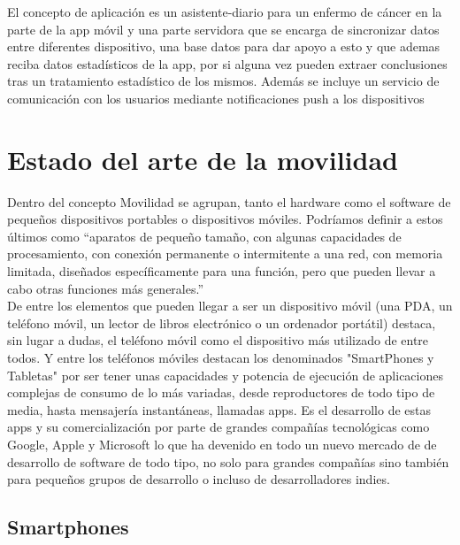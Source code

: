 \documentclass[../pfc.tex]{subfiles}
\begin{document}
	
	El concepto de aplicación es un asistente-diario para un enfermo de cáncer en la parte de la app móvil y una parte servidora que se encarga de sincronizar datos entre diferentes dispositivo, una base datos para dar apoyo a esto y que ademas reciba datos estadísticos de la app, por si alguna vez pueden extraer conclusiones tras un tratamiento estadístico de los mismos. Además se incluye un servicio de comunicación con los usuarios mediante notificaciones push a los dispositivos
	
	
	\section{Estado del arte de la movilidad}
	Dentro del concepto Movilidad se agrupan, tanto el hardware como el software de pequeños dispositivos portables o dispositivos móviles. Podríamos definir a estos últimos como “aparatos de pequeño tamaño, con algunas capacidades de procesamiento, con conexión permanente o intermitente a una red, con memoria limitada, diseñados específicamente para una función, pero que pueden llevar a cabo otras funciones más generales.”\\
	
	De entre los elementos que pueden llegar a ser un dispositivo móvil (una PDA, un teléfono móvil, un lector de libros electrónico o un ordenador portátil) destaca, sin lugar a dudas, el teléfono móvil como el dispositivo más utilizado de entre todos. Y entre los teléfonos móviles destacan los denominados "SmartPhones y Tabletas" por ser tener unas capacidades y potencia de ejecución de aplicaciones complejas de consumo de lo más variadas, desde reproductores de todo tipo de media, hasta mensajería instantáneas, llamadas apps. Es el desarrollo de estas apps y su comercialización por parte de grandes compañías tecnológicas como Google, Apple y Microsoft lo que ha devenido en todo un nuevo mercado de de desarrollo de software de todo tipo, no solo para grandes compañías sino también para pequeños grupos de desarrollo o incluso de desarrolladores indies. 
	
	\subsection{Smartphones}
	
\end{document}
